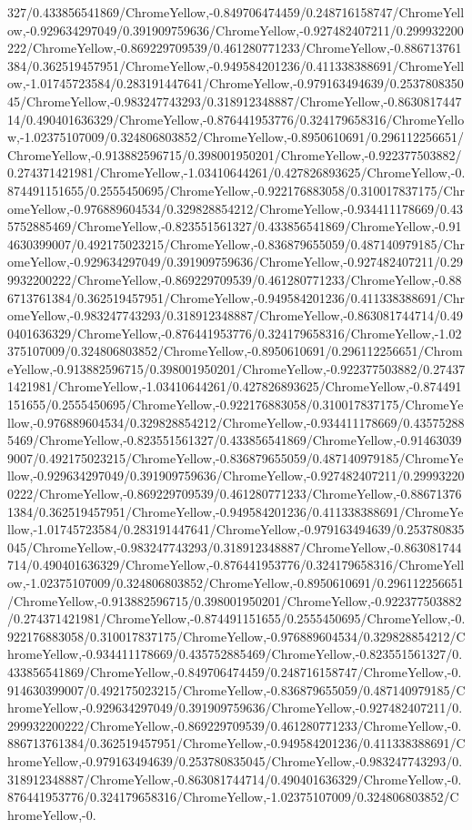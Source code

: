 {\begin{tikzternal}
{327/0.433856541869/ChromeYellow,-0.849706474459/0.248716158747/ChromeYellow,-0.929634297049/0.391909759636/ChromeYellow,-0.927482407211/0.299932200222/ChromeYellow,-0.869229709539/0.461280771233/ChromeYellow,-0.886713761384/0.362519457951/ChromeYellow,-0.949584201236/0.411338388691/ChromeYellow,-1.01745723584/0.283191447641/ChromeYellow,-0.979163494639/0.253780835045/ChromeYellow,-0.983247743293/0.318912348887/ChromeYellow,-0.863081744714/0.490401636329/ChromeYellow,-0.876441953776/0.324179658316/ChromeYellow,-1.02375107009/0.324806803852/ChromeYellow,-0.8950610691/0.296112256651/ChromeYellow,-0.913882596715/0.398001950201/ChromeYellow,-0.922377503882/0.274371421981/ChromeYellow,-1.03410644261/0.427826893625/ChromeYellow,-0.874491151655/0.2555450695/ChromeYellow,-0.922176883058/0.310017837175/ChromeYellow,-0.976889604534/0.329828854212/ChromeYellow,-0.934411178669/0.435752885469/ChromeYellow,-0.823551561327/0.433856541869/ChromeYellow,-0.914630399007/0.492175023215/ChromeYellow,-0.836879655059/0.487140979185/ChromeYellow,-0.929634297049/0.391909759636/ChromeYellow,-0.927482407211/0.299932200222/ChromeYellow,-0.869229709539/0.461280771233/ChromeYellow,-0.886713761384/0.362519457951/ChromeYellow,-0.949584201236/0.411338388691/ChromeYellow,-0.983247743293/0.318912348887/ChromeYellow,-0.863081744714/0.490401636329/ChromeYellow,-0.876441953776/0.324179658316/ChromeYellow,-1.02375107009/0.324806803852/ChromeYellow,-0.8950610691/0.296112256651/ChromeYellow,-0.913882596715/0.398001950201/ChromeYellow,-0.922377503882/0.274371421981/ChromeYellow,-1.03410644261/0.427826893625/ChromeYellow,-0.874491151655/0.2555450695/ChromeYellow,-0.922176883058/0.310017837175/ChromeYellow,-0.976889604534/0.329828854212/ChromeYellow,-0.934411178669/0.435752885469/ChromeYellow,-0.823551561327/0.433856541869/ChromeYellow,-0.914630399007/0.492175023215/ChromeYellow,-0.836879655059/0.487140979185/ChromeYellow,-0.929634297049/0.391909759636/ChromeYellow,-0.927482407211/0.299932200222/ChromeYellow,-0.869229709539/0.461280771233/ChromeYellow,-0.886713761384/0.362519457951/ChromeYellow,-0.949584201236/0.411338388691/ChromeYellow,-1.01745723584/0.283191447641/ChromeYellow,-0.979163494639/0.253780835045/ChromeYellow,-0.983247743293/0.318912348887/ChromeYellow,-0.863081744714/0.490401636329/ChromeYellow,-0.876441953776/0.324179658316/ChromeYellow,-1.02375107009/0.324806803852/ChromeYellow,-0.8950610691/0.296112256651/ChromeYellow,-0.913882596715/0.398001950201/ChromeYellow,-0.922377503882/0.274371421981/ChromeYellow,-0.874491151655/0.2555450695/ChromeYellow,-0.922176883058/0.310017837175/ChromeYellow,-0.976889604534/0.329828854212/ChromeYellow,-0.934411178669/0.435752885469/ChromeYellow,-0.823551561327/0.433856541869/ChromeYellow,-0.849706474459/0.248716158747/ChromeYellow,-0.914630399007/0.492175023215/ChromeYellow,-0.836879655059/0.487140979185/ChromeYellow,-0.929634297049/0.391909759636/ChromeYellow,-0.927482407211/0.299932200222/ChromeYellow,-0.869229709539/0.461280771233/ChromeYellow,-0.886713761384/0.362519457951/ChromeYellow,-0.949584201236/0.411338388691/ChromeYellow,-0.979163494639/0.253780835045/ChromeYellow,-0.983247743293/0.318912348887/ChromeYellow,-0.863081744714/0.490401636329/ChromeYellow,-0.876441953776/0.324179658316/ChromeYellow,-1.02375107009/0.324806803852/ChromeYellow,-0.}
\end{tikzternal}}
